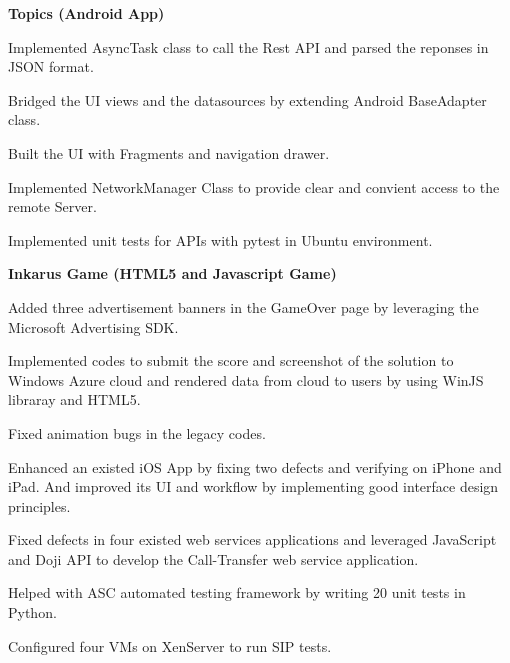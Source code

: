 \documentclass[a4paper]{lyu-resume} %
\begin{document}
\begin{minipage}[t]{0.66\textwidth}

\textbf{Topics (Android App)}
\begin{tightitemize}
\item Implemented AsyncTask class to call the Rest API and parsed the reponses in JSON format.
\item Bridged the UI views and the datasources by extending Android BaseAdapter class.
\item Built the UI with Fragments and navigation drawer.
\item Implemented NetworkManager Class to provide clear and convient access to the remote Server.
\item Implemented unit tests for APIs with pytest in Ubuntu environment. 
\end{tightitemize}

\vspace{2 mm}
\textbf{Inkarus Game (HTML5 and Javascript Game)}
\begin{tightitemize}
\item Added three advertisement banners in the GameOver page by leveraging the Microsoft Advertising SDK.
\item Implemented codes to submit the score and screenshot of the solution to Windows Azure cloud and rendered data from cloud to users by using WinJS libraray and HTML5.
\item Fixed animation bugs in the legacy codes.
\end{tightitemize}

\sectionspace %



\begin{tightitemize}
\item Enhanced an existed iOS App by fixing two defects and verifying on iPhone and iPad. And improved its UI and workflow by implementing good interface design principles.
\item Fixed defects in four existed web services applications and leveraged JavaScript and Doji API to develop the Call-Transfer web service application. 
\item Helped with ASC automated testing framework by writing 20 unit tests in Python.
\item Configured four VMs on XenServer to run SIP tests.
\end{tightitemize}


\end{minipage}
\end{document}
